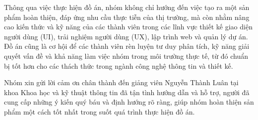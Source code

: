 Thông qua việc thực hiện đồ án, nhóm không chỉ hướng đến việc tạo ra một sản phẩm hoàn thiện, đáp ứng nhu cầu thực tiễn của thị trường, mà còn nhằm nâng cao kiến thức và kỹ năng của các thành viên trong các lĩnh vực thiết kế giao diện người dùng (UI), trải nghiệm người dùng (UX), lập trình web và quản lý dự án. Đồ án cũng là cơ hội để các thành viên rèn luyện tư duy phân tích, kỹ năng giải quyết vấn đề và khả năng làm việc nhóm trong môi trường thực tế, từ đó chuẩn bị tốt hơn cho các thách thức trong ngành công nghệ thông tin và thiết kế.

Nhóm xin gửi lời cảm ơn chân thành đến giảng viên Nguyễn Thành Luân tại khoa Khoa học và kỹ thuật thông tin đã tận tình hướng dẫn và hỗ trợ, người đã cung cấp những ý kiến quý báu và định hướng rõ ràng, giúp nhóm hoàn thiện sản phẩm một cách tốt nhất trong suốt quá trình thực hiện đồ án.
